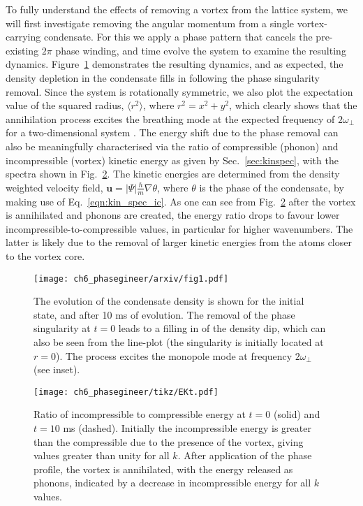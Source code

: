 To fully understand the effects of removing a vortex from the lattice system, we will first investigate removing the angular momentum from a single vortex-carrying condensate. For this we apply a phase pattern that cancels the pre-existing $2\pi$ phase winding, and time evolve the system to examine the resulting dynamics. Figure~\ref{fig:annihilation_1vtx} demonstrates the resulting dynamics, and as expected, the density depletion in the condensate fills in following the phase singularity removal. Since the system is rotationally symmetric, we also plot the expectation value of the squared radius, $\langle r^2 \rangle$, where $r^2 = x^2 + y^2$, which clearly shows that the annihilation process excites the breathing mode at the expected frequency of $2\omega_\perp$ for a two-dimensional system \cite{BEC:Pitaevskii_pra_1997,BEC:Watanabe_pra_2007}. The energy shift due to the phase removal can also be meaningfully characterised via the ratio of compressible (phonon) and incompressible (vortex) kinetic energy as given by Sec.~\ref{sec:kinspec}, with the spectra shown in Fig.~\ref{fig:kinspec}. The kinetic energies are determined from the density weighted velocity field, $\mathbf{u} = |\Psi|\frac{\hbar}{m}\nabla \theta$, where $\theta$ is the phase of the condensate, by making use of Eq.~\eqref{eqn:kin_spec_ic}. As one can see from Fig.~\ref{fig:kinspec} after the vortex is annihilated and phonons are created, the energy ratio drops to favour lower incompressible-to-compressible values, in particular for higher wavenumbers. The latter is likely due to the removal of larger kinetic energies from the atoms closer to the vortex core.

\begin{figure}\centering
    \texttt{[image: ch6\_phasegineer/arxiv/fig1.pdf]}
    \caption{The evolution of the condensate density is shown for the initial state, and after 10 ms of evolution. The removal of the phase singularity at $t=0$ leads to a filling in of the density dip, which can also be seen from the line-plot (the singularity is initially located at $r=0$). The process excites the monopole mode at frequency $2\omega_\perp$ (see inset).}\label{fig:annihilation_1vtx}
\end{figure}
\begin{figure}\centering
    \texttt{[image: ch6\_phasegineer/tikz/EKt.pdf]}
    \caption{Ratio of incompressible to compressible energy at  $t=0$ (solid) and $t=10$ ms (dashed). Initially the incompressible energy is greater than the compressible due to the presence of the vortex, giving values greater than unity for all $k$. After application of the phase profile, the vortex is annihilated, with the energy released as phonons, indicated by a decrease in incompressible energy for all $k$ values.}\label{fig:kinspec}
\end{figure}

